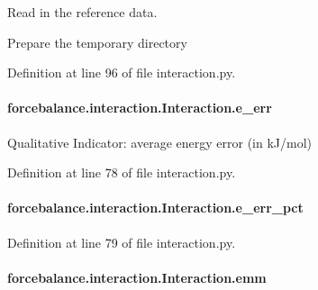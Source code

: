 Read in the reference data. 

Prepare the temporary directory 

Definition at line 96 of file interaction.\-py.

\hypertarget{classforcebalance_1_1interaction_1_1Interaction_a1577e34cd7031365ade75a2a56ec9b0d}{
\paragraph[{e\-\_\-err}]{\setlength{\rightskip}{0pt plus 5cm}forcebalance.\-interaction.\-Interaction.\-e\-\_\-err\hspace{0.3cm}{\ttfamily [inherited]}}}\label{classforcebalance_1_1interaction_1_1Interaction_a1577e34cd7031365ade75a2a56ec9b0d}


Qualitative Indicator\-: average energy error (in k\-J/mol) 



Definition at line 78 of file interaction.\-py.

\hypertarget{classforcebalance_1_1interaction_1_1Interaction_ae66b1b95cac5307950ae787b5409200b}{
\paragraph[{e\-\_\-err\-\_\-pct}]{\setlength{\rightskip}{0pt plus 5cm}forcebalance.\-interaction.\-Interaction.\-e\-\_\-err\-\_\-pct\hspace{0.3cm}{\ttfamily [inherited]}}}\label{classforcebalance_1_1interaction_1_1Interaction_ae66b1b95cac5307950ae787b5409200b}


Definition at line 79 of file interaction.\-py.

\hypertarget{classforcebalance_1_1interaction_1_1Interaction_a2b97abefbf9d9f2b061b9da3b9d0bb30}{
\paragraph[{emm}]{\setlength{\rightskip}{0pt plus 5cm}forcebalance.\-interaction.\-Interaction.\-emm\hspace{0.3cm}{\ttfamily [inherited]}}}\label{classforcebalance_1_1interaction_1_1Interaction_a2b97abefbf9d9f2b061b9da3b9d0bb30}


